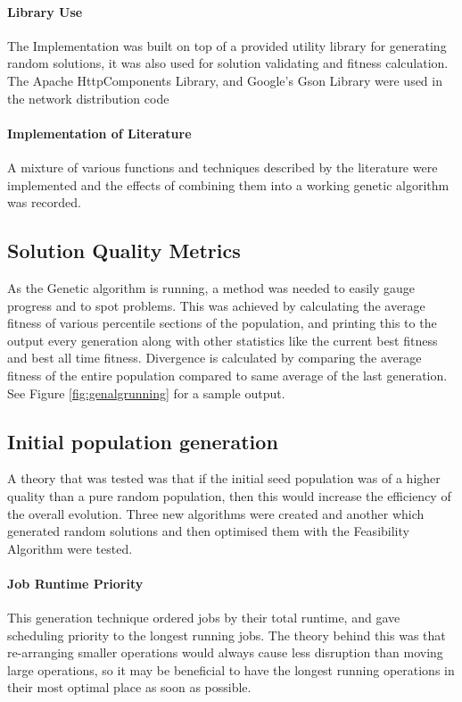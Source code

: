 \documentclass[14pt]{acmsiggraph}
\begin{document}
\paragraph{Library Use}
The Implementation was built on top of a provided utility library for generating random solutions, it was also used for solution validating and fitness calculation.\\
The Apache HttpComponents Library, and Google's Gson Library were used in the network distribution code

\paragraph{Implementation of Literature}
A mixture of various functions and techniques described by the literature were implemented and the effects of combining them into a working genetic algorithm was recorded.

\subsection{Solution Quality Metrics}
As the Genetic algorithm is running, a method was needed to easily gauge progress and to spot problems. This was achieved by calculating the average fitness of various percentile sections of the population, and printing this to the output every generation along with other statistics like the current best fitness and  best all time fitness.  Divergence is calculated by comparing the average fitness of the entire population compared to same average of the last generation.
See Figure \ref{fig:genalgrunning} for a sample output.

\subsection{Initial population generation}
A theory that was tested was that if the initial seed population was of a higher quality than a pure random population, then this would increase the efficiency of the overall evolution. Three new algorithms were created and another which generated random solutions and then optimised them with the Feasibility Algorithm were tested.

\paragraph{Job Runtime Priority}
This generation technique ordered jobs by their total runtime, and gave  scheduling priority to the longest running jobs. The theory behind this was that re-arranging smaller operations would always cause less disruption than moving large operations, so it may be beneficial to have the longest running operations in their most optimal place as soon as possible.
\end{document}
